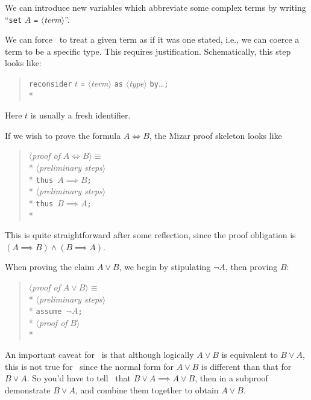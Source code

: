 \begin{node}[Set]\label{mizar-000H}%
We can introduce new variables which abbreviate some complex terms by
writing ``\texttt{set} $A$ \texttt{=} $\langle$\textit{term\/}$\rangle$''.
\end{node}

\begin{node}\label{mizar-000I}%
We can force \Mizar\ to treat a given term as if it was one stated,
i.e., we can coerce a term to be a specific type. This requires
justification. Schematically, this step looks like:
\begin{verse}
  \texttt{reconsider} $t$ \texttt{=} $\langle$\textit{term\/}$\rangle$ \texttt{as} $\langle$\textit{type\/}$\rangle$ \texttt{by}\dots\texttt{;}\\*
\end{verse}
Here $t$ is usually a fresh identifier.
\end{node}

\begin{node}\label{mizar-000F}%
If we wish to prove the formula $A\iff B$, the Mizar proof skeleton
looks like
\begin{verse}
$\langle$\emph{proof of \/}$A\iff B\rangle \equiv$\\*
\qquad $\langle$\emph{preliminary steps\/}$\rangle$\\*
\qquad \texttt{thus }$A\implies B$\texttt{;}\\*
\qquad $\langle$\emph{preliminary steps\/}$\rangle$\\*
\qquad \texttt{thus }$B\implies A$\texttt{;}\\*
\end{verse}
This is quite straightforward after some reflection, since the proof
obligation is $(A\implies B)\land(B\implies A)$.
\end{node}

\begin{node}\label{mizar-000G}%
When proving the claim $A\lor B$, we begin by stipulating $\neg A$,
then proving $B$:
\begin{verse}
$\langle$\emph{proof of \/}$A\lor B\rangle \equiv$\\*
\qquad $\langle$\emph{preliminary steps\/}$\rangle$\\*
\qquad \texttt{assume }$\neg A$\texttt{;}\\*
\qquad $\langle$\emph{proof of \/}$B\rangle$\\*
\end{verse}
An important caveat for \Mizar\ is that although logically $A\lor B$
is equivalent to $B\lor A$, this is not true for \Mizar\ since the
normal form for $A\lor B$ is different than that for $B\lor A$. So you'd
have to tell \Mizar\ that $B\lor A\implies A\lor B$, then in a subproof
demonstrate $B\lor A$, and combine them together to obtain $A\lor B$.
\end{node}

